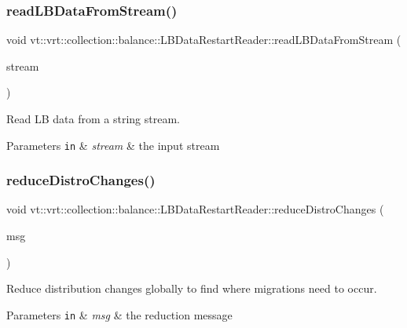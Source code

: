 \subsubsection{\texorpdfstring{read\+L\+B\+Data\+From\+Stream()}{readLBDataFromStream()}}
{\footnotesize\ttfamily void vt\+::vrt\+::collection\+::balance\+::\+L\+B\+Data\+Restart\+Reader\+::read\+L\+B\+Data\+From\+Stream (\begin{DoxyParamCaption}\item[{std\+::stringstream}]{stream }\end{DoxyParamCaption})}



Read LB data from a string stream. 


\begin{DoxyParams}[1]{Parameters}
\mbox{\tt in}  & {\em stream} & the input stream \\
\hline
\end{DoxyParams}
\mbox{\label{structvt_1_1vrt_1_1collection_1_1balance_1_1_l_b_data_restart_reader_a8e8e7c6ddc116665061679c876257a3d}} 
\subsubsection{\texorpdfstring{reduce\+Distro\+Changes()}{reduceDistroChanges()}}
{\footnotesize\ttfamily void vt\+::vrt\+::collection\+::balance\+::\+L\+B\+Data\+Restart\+Reader\+::reduce\+Distro\+Changes (\begin{DoxyParamCaption}\item[{\hyperlink{structvt_1_1vrt_1_1collection_1_1balance_1_1_l_b_data_restart_reader_a59e2b9e568683c89c9af430adacba420}{Reduce\+Msg} $\ast$}]{msg }\end{DoxyParamCaption})\hspace{0.3cm}{\ttfamily [private]}}



Reduce distribution changes globally to find where migrations need to occur. 


\begin{DoxyParams}[1]{Parameters}
\mbox{\tt in}  & {\em msg} & the reduction message \\
\hline
\end{DoxyParams}
\mbox{\label{structvt_1_1vrt_1_1collection_1_1balance_1_1_l_b_data_restart_reader_a26454044882316e639cbfbea61f41c61}} 
